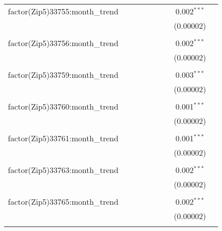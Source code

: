 \begin{table}[H]
{\begin{tabular}{@{\extracolsep{5pt}}lcccccccc}
  factor(Zip5)33755:month\_trend &  &  &  &  &  &  & 0.002$^{***}$ &  \\  

   &  &  &  &  &  &  & (0.00002) &  \\  

   & & & & & & & & \\  

  factor(Zip5)33756:month\_trend &  &  &  &  &  &  & 0.002$^{***}$ &  \\  

   &  &  &  &  &  &  & (0.00002) &  \\  

   & & & & & & & & \\  

  factor(Zip5)33759:month\_trend &  &  &  &  &  &  & 0.003$^{***}$ &  \\  

   &  &  &  &  &  &  & (0.00002) &  \\  

   & & & & & & & & \\  

  factor(Zip5)33760:month\_trend &  &  &  &  &  &  & 0.001$^{***}$ &  \\  

   &  &  &  &  &  &  & (0.00002) &  \\  

   & & & & & & & & \\  

  factor(Zip5)33761:month\_trend &  &  &  &  &  &  & 0.001$^{***}$ &  \\  

   &  &  &  &  &  &  & (0.00002) &  \\  

   & & & & & & & & \\  

  factor(Zip5)33763:month\_trend &  &  &  &  &  &  & 0.002$^{***}$ &  \\  

   &  &  &  &  &  &  & (0.00002) &  \\  

   & & & & & & & & \\  

  factor(Zip5)33765:month\_trend &  &  &  &  &  &  & 0.002$^{***}$ &  \\  

   &  &  &  &  &  &  & (0.00002) &  \\  

   & & & & & & & & \\  


\end{tabular}}
\end{table}
